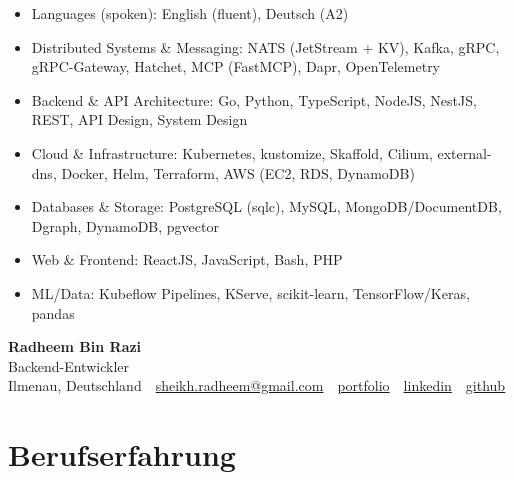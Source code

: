 \documentclass[10pt,a4paper]{resume}
\makeatletter
\newcommand{\Portfolio}{https://radheem.github.io/my-cv}
\newcommand{\PortfolioText}{portfolio}
\newcommand{\GitHub}{https://github.com/radheem}
\newcommand{\LinkedIn}{https://www.linkedin.com/in/radheem-razi}
\newcommand{\Email}{sheikh.radheem@gmail.com}
\makeatother
\begin{document}
\begin{itemize}[leftmargin=1.4em,nosep,topsep=2pt]
  \item Languages (spoken): English (fluent), Deutsch (A2)
  \item Distributed Systems \& Messaging: NATS (JetStream + KV), Kafka, gRPC, gRPC-Gateway, Hatchet, MCP (FastMCP), Dapr, OpenTelemetry
  \item Backend \& API Architecture: Go, Python, TypeScript, NodeJS, NestJS, REST, API Design, System Design
  \item Cloud \& Infrastructure: Kubernetes, kustomize, Skaffold, Cilium, external-dns, Docker, Helm, Terraform, AWS (EC2, RDS, DynamoDB)
  \item Databases \& Storage: PostgreSQL (sqlc), MySQL, MongoDB/DocumentDB, Dgraph, DynamoDB, pgvector
  \item Web \& Frontend: ReactJS, JavaScript, Bash, PHP
  \item ML/Data: Kubeflow Pipelines, KServe, scikit-learn, TensorFlow/Keras, pandas
\end{itemize}

\clearpage
{}

\begin{center}
  {\huge\bfseries Radheem Bin Razi}\\[3pt]
  {\large Backend-Entwickler}\\[6pt]
  \small
  Ilmenau, Deutschland \,\textbar\,
  \href{mailto:\Email}{\Email} \,\textbar\,
  \href{\Portfolio}{\PortfolioText} \,\textbar\,
  \href{\LinkedIn}{linkedin} \,\textbar\,
  \href{\GitHub}{github}
\end{center}
\vspace{2pt}

\section{Berufserfahrung}
\end{document}
